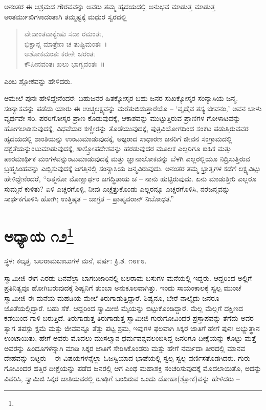 ಅನಂತರ ಈ ಆಶ್ರಮದ ಗೌರವವನ್ನು ಅವರು ತಮ್ಮ ಹೃದಯದಲ್ಲಿ ಅನುಭವ ಮಾಡುತ್ತ ಮಾಡುತ್ತ ಅಂತರ್ಮುಖಿಗಳಾದಂತಾಗಿ ತಮ್ಮಷ್ಟಕ್ಕೆ ಮಧುರ ಸ್ವರದಲ್ಲಿ

\begin{verse}
ವೇದಾಂತವಾಕ್ಯೇಷು ಸದಾ ರಮಂತಃ,\\ಭಿಕ್ಷಾನ್ನ ಮಾತ್ರೇಣ ಚ ತುಷ್ಟಿಮಂತಃ~।\\ಅಶೋಕಮಂತಃ ಕರಣೇ ಚರಂತಃ\\ಕೌಪೀನವಂತಃ ಖಲು ಭಾಗ್ಯವಂತಃ~॥
\end{verse}

ಎಂಬ ಶ್ಲೋಕವನ್ನು ಹೇಳಿದರು.

ಆಮೇಲೆ ಪುನಃ ಹೇಳಿದ್ದೇನೆಂದರೆ: ಬಹುಜನರ ಹಿತಕ್ಕೋಸ್ಕರ ಬಹು ಜನರ ಸುಖಕ್ಕೋಸ್ಕರ ಸಂನ್ಯಾಸಿಯ ಜನ್ಮ. ಸಂನ್ಯಾಸವನ್ನು ಪಡೆದು ಯಾರು ಈ ಉಚ್ಚಲಕ್ಷ್ಯವನ್ನು ಮರೆತುಬಿಡುತ್ತಾರೆಯೊ – ‘ವೃಥೈವ ತಸ್ಯ ಜೀವನಂ,’ ಅವನ ಬಾಳು ವ್ಯರ್ಥವೇ ಸರಿ. ಪರರಿಗೋಸ್ಕರ ಪ್ರಾಣ ಕೊಡುವುದಕ್ಕೆ, ಆಕಾಶವನ್ನು ಮುಟ್ಟುತ್ತಿರುವ ಪ್ರಾಣಿಗಳ ಗೋಳಾಟವನ್ನು ಹೋಗಲಾಡಿಸುವುದಕ್ಕೆ, ವಿಧವೆಯರ ಕಣ್ಣೀರನ್ನು ತೊಡೆಯುವುದಕ್ಕೆ, ಪುತ್ರವಿಯೋಗದಿಂದ ಸಂಕಟ ಪಡುತ್ತಿರುವವರ ಹೃದಯದಲ್ಲಿ ಶಾಂತಿಯನ್ನು ಉಂಟುಮಾಡುವುದಕ್ಕೆ, ಅಜ್ಞರಾದ ಸಾಧಾರಣ ಜನರಿಗೆ ಜೀವನ ಸಂಗ್ರಾಮದಲ್ಲಿ ದಕ್ಷತೆಯನ್ನುಂಟುಮಾಡುವುದಕ್ಕೆ, ಶಾಸ್ತ್ರೋಪದೇಶವನ್ನು ಹರಡುವುದರ ಮೂಲಕ ಎಲ್ಲರಿಗೂ ಐಹಿಕ ಮತ್ತು ಪಾರಮಾರ್ಥಿಕ ಮಂಗಳವನ್ನುಂಟುಮಾಡುವುದಕ್ಕೆ ಮತ್ತು ಜ್ಞಾನಾಲೋಕವನ್ನು ಬೆಳಗಿ ಎಲ್ಲರಲ್ಲಿಯೂ ನಿದ್ರಿಸುತ್ತಿರುವ ಬ್ರಹ್ಮಸಿಂಹವನ್ನು ಎಬ್ಬಿಸುವುದಕ್ಕೆ ಜಗತ್ತಿನಲ್ಲಿ ಸಂನ್ಯಾಸಿಯ ಜನ್ಮವಿರುವುದು. ಅನಂತರ ತಮ್ಮ ಭ್ರಾತೃಗಳ ಕಡೆಗೆ ಲಕ್ಷ್ಯವಿಟ್ಟು ಹೇಳಿದ್ದೇನೆಂದರೆ, “ಆತ್ಮನೋ ಮೋಕ್ಷಾರ್ಥಂ ಜಗದ್ಧಿತಾಯ ಚ – ನಾನು ಹುಟ್ಟಿರುವುದು. ಏನು ಮಾಡುತ್ತೀರಿ ಎಲ್ಲರೂ ಸುಮ್ಮನೆ ಕುಳಿತು? ಏಳಿ ಎಚ್ಚರಗೊಳ್ಳಿ, ನೀವು ಎಚ್ಚೆತ್ತುಕೊಂಡು ಎಲ್ಲರನ್ನೂ ಎಚ್ಚರಗೊಳಿಸಿ, ನರಜನ್ಮವನ್ನು ಸಾರ್ಥಕಗೊಳಿಸಿ ಹೋಗಿ; ಉತ್ತಿಷ್ಠತ – ಜಾಗ್ರತ – ಪ್ರಾಪ್ಯವರಾನ್ ನಿಬೋಧತ.”

\newpage

\chapter[ಅಧ್ಯಾಯ ೧೨]{ಅಧ್ಯಾಯ ೧೨\protect\footnote{}}

\centerline{ಸ್ಥಳ: ಕಲ್ಕತ್ತ, ಬಲರಾಮಬಾಬುಗಳ ಮನೆ, ವರ್ಷ: ಕ್ರಿ.ಶ. ೧೮೯೮.}

ಸ್ವಾಮೀಜಿ ಈಗ ಎರಡು ದಿನವೆಲ್ಲಾ ಬಾಗಬಜಾರಿನಲ್ಲಿ ಬಲರಾಮ ಬಸುಗಳ ಮನೆಯಲ್ಲಿ ಇದ್ದರು. ಆದ್ದರಿಂದ ಅಲ್ಲಿಗೆ ಪ್ರತಿನಿತ್ಯವೂ ಹೋಗಿಬರುವುದಕ್ಕೆ ಶಿಷ್ಯನಿಗೆ ತುಂಬಾ ಅನುಕೂಲವಾಗಿತ್ತು. ಇಂದು ಸಾಯಂಕಾಲಕ್ಕೆ ಸ್ವಲ್ಪ ಮುಂಚೆ ಸ್ವಾಮೀಜಿ ಈ ಮನೆಯ ಮಹಡಿಯ ಮೇಲೆ ತಿರುಗಾಡುತ್ತಿದ್ದಾರೆ. ಶಿಷ್ಯನೂ, ಬೇರೆ ನಾಲ್ಕೈದು ಜನರೂ ಜೊತೆಯಲ್ಲಿದ್ದಾರೆ. ಬಹು ಸೆಕೆ. ಆದ್ದರಿಂದ ಸ್ವಾಮೀಜಿ ಮೈಯನ್ನು ಬಿಟ್ಟುಕೊಂಡಿದ್ದಾರೆ. ಮೆಲ್ಲ ಮೆಲ್ಲಗೆ ದಕ್ಷಿಣದ ಕಡೆಯಿಂದ ಗಾಳಿ ಬರುತ್ತಿದೆ. ತಿರುಗಾಡುತ್ತ ತಿರುಗಾಡುತ್ತ ಸ್ವಾಮೀಜಿ ಗುರುಗೋವಿಂದರ ಪ್ರಸ್ತಾಪವನ್ನು ತೆಗೆದು ಅವರ ತ್ಯಾಗ ತಪಸ್ಸು ಕ್ಷಮೆ ಮತ್ತು ಜೀವವನ್ನೂ ತೆತ್ತು ಪಟ್ಟ ಶ್ರಮ, ಇವುಗಳ ಫಲವಾಗಿ ಸಿಕ್ಕರ ಜಾತಿಗೆ ಹೇಗೆ ಪುನಃ ಅಭ್ಯುತ್ಥಾನ ಉಂಟಾಯಿತು, ಹೇಗೆ ಅವರು ಮೊದಲು ಮುಸಲ್ಮಾನ ಧರ್ಮವನ್ನವಲಂಬಿಸಿದ್ದ ಜನರಿಗೂ ದೀಕ್ಷೆಯನ್ನು ಕೊಟ್ಟು ಮತ್ತೆ ಅವರನ್ನು ಹಿಂದೂಗಳನ್ನಾಗಿ ಮಾಡಿ ಸಿಕ್ಕರ ಜಾತಿಗೆ ಸೇರಿಸಿಕೊಂಡರು ಮತ್ತು ಹೇಗೆ ನರ್ಮದಾ ತೀರದಲ್ಲಿ ಮಾನವ ದೇಹವನ್ನು ಬಿಟ್ಟರು – ಈ ವಿಷಯಗಳನ್ನೆಲ್ಲಾ ಓಜಸ್ವಿಯಾದ ಭಾಷೆಯಲ್ಲಿ ಸ್ವಲ್ಪ ಸ್ವಲ್ಪ ವರ್ಣಿಸತೊಡಗಿದರು. ಗುರು ಗೋವಿಂದರ ಹತ್ತಿರ ದೀಕ್ಷೆಯನ್ನು ಪಡೆದ ಜನರಲ್ಲಿ ಆಗ ಎಂಥ ಮಹಾಶಕ್ತಿ ಸಂಚರಿಸುವುದಕ್ಕೆ ಮೊದಲಾಯಿತೊ, ಅದನ್ನು ವಿವರಿಸಿ, ಸ್ವಾಮಿಜಿ ಸಿಕ್ಕರ ಜಾತಿಯವರಲ್ಲಿ ರೂಢಿಗೆ ಬಂದಿರುವ ಒಂದು ದೋಹಾ(ಶ್ಲೋಕ)ವನ್ನು ಹೇಳಿದರು –


